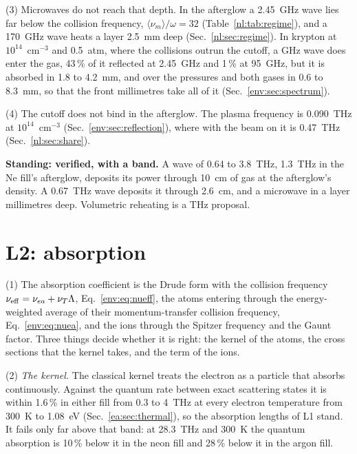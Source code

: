 {\noindent}(3) Microwaves do not reach that depth. In the afterglow a 2.45~GHz wave
lies far below the collision frequency, $\langle\nu_m\rangle/\omega=32$
(Table~\ref{nl:tab:regime}), and a 170~GHz wave heats a layer 2.5~mm deep
(Sec.~\ref{nl:sec:regime}). In krypton at $10^{14}$~cm$^{-3}$ and 0.5~atm, where the
collisions outrun the cutoff, a GHz wave does enter the gas, 43\,\% of it reflected at
2.45~GHz and 1\,\% at 95~GHz, but it is absorbed in 1.8 to 4.2~mm, and over the
pressures and both gases in 0.6 to 8.3~mm, so that the front millimetres take all of it
(Sec.~\ref{env:sec:spectrum}).

{\noindent}(4) The cutoff does not bind in the afterglow. The plasma frequency is
0.090~THz at $10^{14}$~cm$^{-3}$ (Sec.~\ref{env:sec:reflection}), where with the beam on
it is 0.47~THz (Sec.~\ref{nl:sec:share}).

\medskip
\noindent\textbf{Standing: verified, with a band.} A wave of 0.64 to 3.8~THz, 1.3~THz in
the Ne fill's afterglow, deposits its power through 10~cm of gas at the afterglow's
density. A 0.67~THz wave deposits it through 2.6~cm, and a microwave in a layer
millimetres deep. Volumetric reheating is a THz proposal.

\section{L2: absorption}
\label{p1:sec:L2}

{\noindent}(1) The absorption coefficient is the Drude form with the collision
frequency $\nu_{\rm eff}=\nu_{ea}+\nu_T\Lambda$, Eq.~\eqref{env:eq:nueff}, the atoms entering
through the energy-weighted average of their momentum-transfer collision frequency,
Eq.~\eqref{env:eq:nuea}, and the ions through the Spitzer frequency and the Gaunt
factor. Three things decide whether it is right: the kernel of the atoms, the cross
sections that the kernel takes, and the term of the ions.

{\noindent}(2) \emph{The kernel.} The classical kernel treats the electron as a
particle that absorbs continuously. Against the quantum rate between exact scattering
states it is within 1.6\,\% in either fill from 0.3 to 4~THz at every electron
temperature from 300~K to 1.08~eV (Sec.~\ref{ea:sec:thermal}), so the absorption lengths
of L1 stand. It fails only far above that band: at 28.3~THz and 300~K the quantum
absorption is 10\,\% below it in the neon fill and 28\,\% below it in the argon fill.

